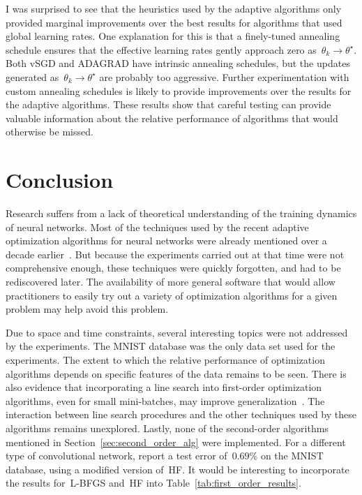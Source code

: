 \documentclass[11pt,a4paper]{article}
\numberwithin{equation}{section}
\begin{document}
I was surprised to see that the heuristics used by the adaptive algorithms only
provided marginal improvements over the best results for algorithms that used
global learning rates. One explanation for this is that a finely-tuned annealing
schedule ensures that the effective learning rates gently approach zero
as~$\theta_k \to \theta^\star$. Both vSGD and ADAGRAD have intrinsic annealing
schedules, but the updates generated as~$\theta_k \to \theta^\star$ are probably
too aggressive. Further experimentation with custom annealing schedules is
likely to provide improvements over the results for the adaptive algorithms.
These results show that careful testing can provide valuable information about
the relative performance of algorithms that would otherwise be missed.

\section{Conclusion}

Research suffers from a lack of theoretical understanding of the training
dynamics of neural networks. Most of the techniques used by the recent adaptive
optimization algorithms for neural networks were already mentioned over a decade
earlier~\citep{lecun-98b}. But because the experiments carried out at that time
were not comprehensive enough, these techniques were quickly forgotten, and had
to be rediscovered later. The availability of more general software that would
allow practitioners to easily try out a variety of optimization algorithms for a
given problem may help avoid this problem.

Due to space and time constraints, several interesting topics were not addressed
by the experiments. The MNIST database was the only data set used for the
experiments. The extent to which the relative performance of optimization
algorithms depends on specific features of the data remains to be seen.  There
is also evidence that incorporating a line search into first-order optimization
algorithms, even for small mini-batches, may improve
generalization~\citep{ngiam2011optimization}. The interaction between line
search procedures and the other techniques used by these algorithms remains
unexplored. Lastly, none of the second-order algorithms mentioned in
Section~\ref{sec:second_order_alg} were implemented. For a different type of
convolutional network, \citet{sutskever2013importance} report a test error
of~$0.69\%$ on the MNIST database, using a modified version of~HF. It would be
interesting to incorporate the results for~L-BFGS and~HF into
Table~\ref{tab:first_order_results}.


\clearpage

\end{document}
